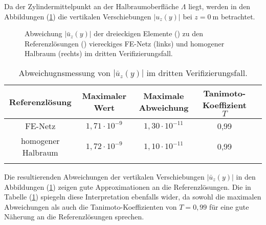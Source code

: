 Da der Zylindermittelpunkt an der Halbraumoberfläche $\Lambda$ liegt, werden in den Abbildungen (\ref{fig:c3}) die vertikalen Verschiebungen $|u_z(y)|$ bei $z = 0\ \mathrm{m}$ betrachtet.
\begin{figure}[H]
	\centering
	\begin{subfigure}{0.49\linewidth}
		\centering
		
	\end{subfigure}\hfill
	\begin{subfigure}{0.49\linewidth}
		\centering
		
	\end{subfigure}
	\caption{Abweichung $|\bar{u}_z(y)|$ der dreieckigen Elemente (\legThree) zu den Referenzlösungen (\legFour) viereckiges FE-Netz (links) und homogener Halbraum (rechts) im dritten Verifizierungsfall.}
	\label{fig:c3}
\end{figure}
\begin{table}[htb]
	\centering
	\normalsize
	{\renewcommand{\arraystretch}{1.15}
		\begin{tabular}{ccccc}
			\firsthline
			Referenzlösung & Maximaler Wert & Maximale Abweichung & Tanimoto-Koeffizient $T$ \\\hline
			FE-Netz & $ 1,71\cdot10^{-9}$ & $1,30\cdot10^{-11}$ & 0,99 \\
			homogener Halbraum & $1,72\cdot10^{-9}$ & $1,10\cdot10^{-11}$ & 0,99 \\\lasthline
	\end{tabular}}
	\caption{Abweichugnsmessung von $|\bar{u}_z(y)|$ im dritten Verifizierungsfall.}
	\label{tab:Fehlermessung_c3}
\end{table}
Die resultierenden Abweichungen der vertikalen Verschiebungen $|\bar{u}_z(y)|$ in den Abbildungen (\ref{fig:c3}) zeigen gute Approximationen an die Referenzlösungen. Die in Tabelle (\ref{tab:Fehlermessung_c3}) spiegeln diese Interpretation ebenfalls wider, da sowohl die maximalen Abweichungen als auch die Tanimoto-Koeffizienten von $T = 0,99$ für eine gute Näherung an die Referenzlösungen sprechen.


